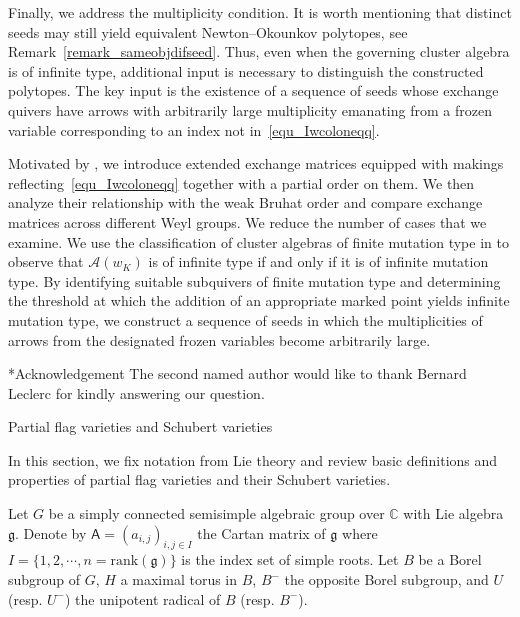 \documentclass[11pt]{amsart}
\makeatletter
\def\section{\@startsection{section}{1}%
  \z@{-1.2\linespacing\@plus-.5\linespacing}{.8\linespacing}%
  {\normalfont\bfseries\large}}
\def\subsection{\@startsection{subsection}{2}%
  \z@{-.8\linespacing\@plus-.3\linespacing}{.3\linespacing\@plus.2\linespacing}%
  {\normalfont\bfseries}}
\newcommand{\C}{\mathbb{C}}
\numberwithin{equation}{section}
\theoremstyle{plain}
\theoremstyle{definition}
\numberwithin{equation}{section}
\newcommand{\g}{\mathfrak{g}}
\newcommand{\cmA}{\mathsf{A}}
\makeatother
\begin{document}
Finally, we address the multiplicity condition. It is worth mentioning that distinct seeds may still yield equivalent Newton--Okounkov polytopes, see Remark~\ref{remark_sameobjdifseed}. Thus, even when the governing cluster algebra is of infinite type, additional input is necessary to distinguish the constructed polytopes. The key input is the existence of a sequence of seeds whose exchange quivers have arrows with arbitrarily large multiplicity emanating from a frozen variable corresponding to an index not in~\eqref{equ_Iwcoloneqq}.

Motivated by \cite{GLS08}, we introduce extended exchange matrices equipped with makings reflecting~\eqref{equ_Iwcoloneqq} together with a partial order on them. We then analyze their relationship with the weak Bruhat order and compare exchange matrices across different Weyl groups. We reduce the number of cases that we examine. We use the classification of cluster algebras of finite mutation type in \cite{FST12} to observe that $\mathcal{A}(w_K)$ is of infinite type if and only if it is of infinite mutation type. By identifying suitable subquivers of finite mutation type and determining the threshold at which the addition of an appropriate marked point yields infinite mutation type, we construct a sequence of seeds in which the multiplicities of arrows from the designated frozen variables become arbitrarily large.
 
 
 
\subsection*{Acknowledgement} 
The second named author would like to thank Bernard Leclerc for kindly answering our question.


\section{Partial flag varieties and Schubert varieties}\label{sec_partialSchvar}

In this section, we fix notation from Lie theory and review basic definitions and properties of partial flag varieties and their Schubert varieties.

Let $G$ be a simply connected semisimple algebraic group over $\C$ with Lie algebra $\g$. Denote by $\cmA = (a_{i,j})_{i,j\in I}$ the Cartan matrix of $\mathfrak{g}$ where $I = \{1, 2, \cdots, n = \mathrm{rank}(\mathfrak{g}) \}$ is the index set of simple roots. Let $B$ be a Borel subgroup of $G$, $H$ a maximal torus in $B$, $B^-$ the opposite Borel subgroup, and $U$ (resp. $U^-$) the unipotent radical of $B$ (resp. $B^-$).
\end{document}
